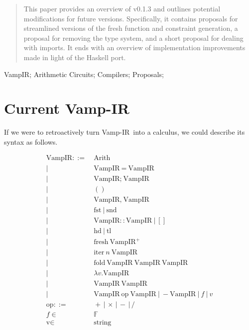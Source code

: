 \documentclass{msc}
\newcommand{\vampir}{Vamp-IR}
\begin{document}


\begin{abstract}
This paper provides an overview of \VampIR{} v0.1.3 and outlines potential modifications for future versions. Specifically, it contains proposals for streamlined versions of the fresh function and constraint generation, a proposal for removing the type system, and a short proposal for dealing with imports. It ends with an overview of implementation improvements made in light of the Haskell port.
\end{abstract}

\begin{keywords}
VampIR;
Arithmetic Circuits;
Compilers;
Proposals;
\end{keywords}
\maketitle

\section{Current \vampir}

If we were to retroactively turn \vampir\ into a calculus, we could describe its syntax as follows.

\begin{align*}
    \text{VampIR} ::=&\ \text{Arith} \\
    |\ &\ \text{VampIR} \ = \ \text{VampIR} \\
    |\ &\ \text{VampIR};\ \text{VampIR} \\
    |\ &\ () \\
    |\ &\ \text{VampIR},\ \text{VampIR} \\
    |\ &\ \text{fst}\ |\ \text{snd} \\
    |\ &\ \text{VampIR}:: \text{VampIR}\ |\ [] \\
    |\ &\ \text{hd}\ |\ \text{tl} \\
    |\ &\ \text{fresh}\ \text{VampIR}^+ \\
    |\ &\ \text{iter}\ n\ \text{VampIR} \\
    |\ &\ \text{fold}\ \text{VampIR}\ \text{VampIR}\ \text{VampIR} \\
    |\ &\ \lambda v . \text{VampIR} \\
    |\ &\ \text{VampIR}\ \text{VampIR} \\
    |\ &\ \text{VampIR} \ \text{op} \ \text{VampIR} \
    |\ - \text{VampIR}\ |\ f\ |\ v \\
    \text{op} ::=&\ + \,|\, \times \,|\, - \,|\, / \\
    f \in&\ \mathbb{F} \\
    \text{v} \in&\ \text{string}
\end{align*}
\end{document}

